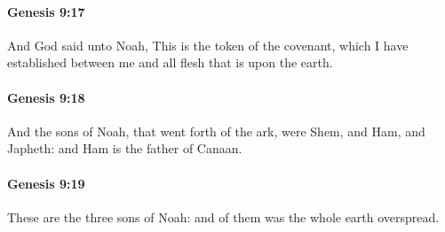 		\paragraph{Genesis 9:17} %
			\label{GENESIS-9-17}

			And God said unto Noah, This is the token of the covenant, which I have established between me and all flesh that is upon the earth.


		\paragraph{Genesis 9:18} %
			\label{GENESIS-9-18}

			And the sons of Noah, that went forth of the ark, were Shem, and Ham, and Japheth: and Ham is the father of Canaan.


		\paragraph{Genesis 9:19} %
			\label{GENESIS-9-19}

			These are the three sons of Noah: and of them was the whole earth overspread.


